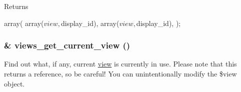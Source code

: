 \begin{DoxyReturn}{Returns}

\begin{DoxyCode}
 array(
   array($view, $display_id),
   array($view, $display_id),
 );
\end{DoxyCode}
 
\end{DoxyReturn}
\hypertarget{views_8module_a3e0de34df0a9358f06a0bc139250ac47}{
\subsubsection[{views\_\-get\_\-current\_\-view}]{\setlength{\rightskip}{0pt plus 5cm}\& views\_\-get\_\-current\_\-view ()}}
\label{views_8module_a3e0de34df0a9358f06a0bc139250ac47}
Find out what, if any, current \hyperlink{classview}{view} is currently in use. Please note that this returns a reference, so be careful! You can unintentionally modify the \$view object.

